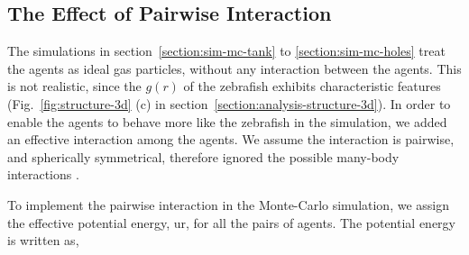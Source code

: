 \documentclass[11pt,twoside]{report}
\begin{document}
\subsection{The Effect of Pairwise Interaction}
\label{section:sim-mc-interaction}



The simulations in section~\ref{section:sim-mc-tank} to \ref{section:sim-mc-holes} treat the agents as ideal gas particles, without any interaction between the agents. This is not realistic, since the $g(r)$ of the zebrafish exhibits characteristic features (Fig.~\ref{fig:structure-3d} (c) in section~\ref{section:analysis-structure-3d}).
In order to enable the agents to behave more like the zebrafish in the simulation, we added an effective interaction among the agents. We assume the interaction is pairwise, and spherically symmetrical, therefore ignored the possible many-body interactions \cite{kursten2020}.

To implement the pairwise interaction in the Monte-Carlo simulation, we assign the effective potential energy, \gls{ur}, for all the pairs of agents. The potential energy is written as,
\end{document}
